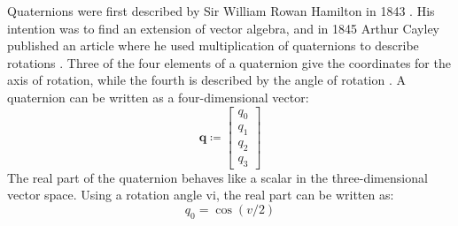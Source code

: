 \documentclass[12pt,a4paper,oneside]{article}
\begin{document}
Quaternions were first described by Sir William Rowan Hamilton in 1843 \citet{hamilton1844lxxviii}. His intention was to find an extension of vector algebra, and in 1845 Arthur Cayley published an article where he used multiplication of quaternions to describe rotations \citet{cayley1845xiii}. Three of the four elements of a quaternion give the coordinates for the axis of rotation, while the fourth is described by the angle of rotation \citet{courant1953methods}.
A quaternion can be written as a four-dimensional vector:
\begin{equation}
\bm{q} \coloneqq \begin{bmatrix}
q_0 \\
q_1 \\
q_2 \\
q_3
\end{bmatrix}
\end{equation}
The real part of the quaternion behaves like a scalar in the three-dimensional vector space.
Using a rotation angle vi, the real part can be written as:
\begin{equation}
q_0 = \cos(v/2)
\end{equation}
\end{document}
